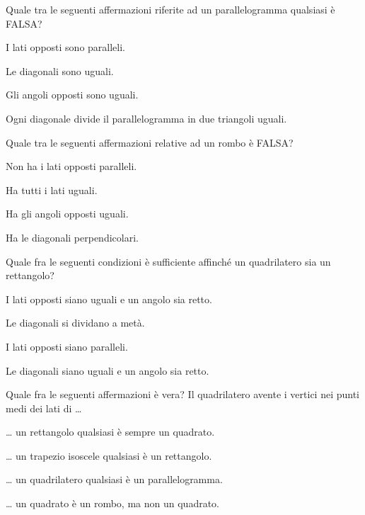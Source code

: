 \begin{esercizio}
\label{ese:4.62}
Quale tra le seguenti affermazioni riferite ad un parallelogramma 
qualsiasi è FALSA?
\begin{enumeratea}
\item I lati opposti sono paralleli.
\item Le diagonali sono uguali.
\item Gli angoli opposti sono uguali.
\item Ogni diagonale divide il parallelogramma in due triangoli 
uguali.
\end{enumeratea}
\end{esercizio}

\begin{esercizio}
\label{ese:4.63}
Quale tra le seguenti affermazioni relative ad un rombo è FALSA?
\begin{multicols}{2}
\begin{enumeratea}
\item Non ha i lati opposti paralleli.
\item Ha tutti i lati uguali.
\item Ha gli angoli opposti uguali.
\item Ha le diagonali perpendicolari.
\end{enumeratea}
\end{multicols}
\end{esercizio}

\begin{esercizio}
\label{ese:4.64}
Quale fra le seguenti condizioni è sufficiente affinché un 
quadrilatero sia un rettangolo?
\begin{enumeratea}
\item I lati opposti siano uguali e un angolo sia retto.
\item Le diagonali si dividano a metà.
\item I lati opposti siano paralleli.
\item Le diagonali siano uguali e un angolo sia retto.
\end{enumeratea}
\end{esercizio}

\begin{esercizio}
\label{ese:4.65}
Quale fra le seguenti affermazioni è vera?
Il quadrilatero avente i vertici nei punti medi dei lati di \ldots{}
\begin{enumeratea}
\item \ldots{} un rettangolo qualsiasi è sempre un quadrato.
\item \ldots{} un trapezio isoscele qualsiasi è un rettangolo.
\item \ldots{} un quadrilatero qualsiasi è un parallelogramma.
\item \ldots{} un quadrato è un rombo, ma non un quadrato.
\end{enumeratea}
\end{esercizio}

